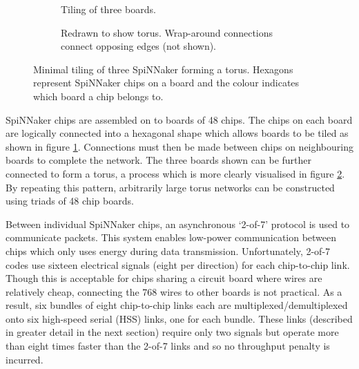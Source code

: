 			\begin{figure}
				\begin{subfigure}[b]{0.49\textwidth}
					\center
					
					
					\caption{Tiling of three boards.\color{white}{\\~}}
					\label{fig:threeboard}
				\end{subfigure}
				\begin{subfigure}[b]{0.49\textwidth}
					\center
					
					\vspace{0.5cm}
					
					\caption{Redrawn to show torus. Wrap-around connections connect
					opposing edges (not shown).}
					\label{fig:threeboard-sliced}
				\end{subfigure}
				
				\caption[Minimal tiling of three SpiNNaker forming a torus.]{Minimal
				tiling of three SpiNNaker forming a torus. Hexagons represent SpiNNaker
				chips on a board and the colour indicates which board a chip belongs
				to.}
				\label{fig:spinnaker-tiling}
			\end{figure}
			
			SpiNNaker chips are assembled on to boards of 48 chips. The chips on each
			board are logically connected into a hexagonal shape which allows boards
			to be tiled as shown in figure \ref{fig:threeboard}. Connections must then
			be made between chips on neighbouring boards to complete the network. The
			three boards shown can be further connected to form a torus, a process
			which is more clearly visualised in figure \ref{fig:threeboard-sliced}. By
			repeating this pattern, arbitrarily large torus networks can be
			constructed using triads of 48 chip boards.
			
			Between individual SpiNNaker chips, an asynchronous `2-of-7' protocol is
			used to communicate packets. This system enables low-power communication
			between chips which only uses energy during data transmission.
			Unfortunately, 2-of-7 codes use sixteen electrical signals (eight per
			direction) for each chip-to-chip link. Though this is acceptable for chips
			sharing a circuit board where wires are relatively cheap, connecting the
			768 wires to other boards is not practical. As a result, six bundles of
			eight chip-to-chip links each are multiplexed/demultiplexed onto six
			high-speed serial (HSS) links, one for each bundle. These links (described
			in greater detail in the next section) require only two signals but
			operate more than eight times faster than the 2-of-7 links and so no
			throughput penalty is incurred.
			

